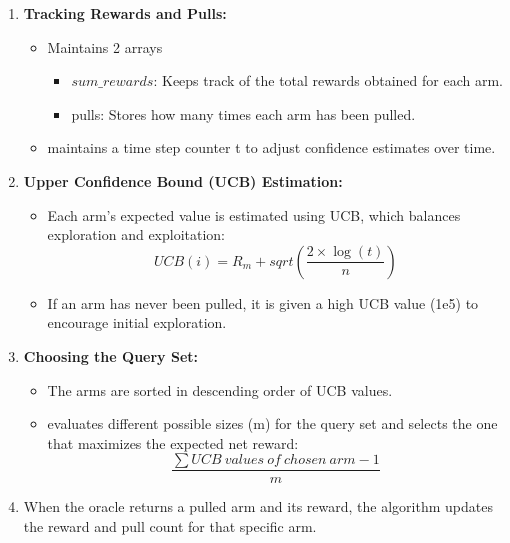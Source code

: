 \documentclass{article}
\begin{document}
    \begin{enumerate}
        \item \textbf{Tracking Rewards and Pulls:} \begin{itemize}
            \item Maintains 2 arrays \begin{itemize}
                \item $sum\_rewards$: Keeps track of the total rewards obtained for each arm.
                \item pulls: Stores how many times each arm has been pulled.
            \end{itemize}
            \item maintains a time step counter t to adjust confidence estimates over time.
        \end{itemize}

        \item \textbf{Upper Confidence Bound (UCB) Estimation:} \begin{itemize}
            \item Each arm’s expected value is estimated using UCB, which balances exploration and exploitation:
            \begin{equation}
                UCB(i) = R_m + sqrt(\frac{2\times \log(t)}{n})
            \end{equation}
            \item If an arm has never been pulled, it is given a high UCB value (1e5) to encourage initial exploration.
        \end{itemize}

        \item \textbf{Choosing the Query Set:} \begin{itemize}
            \item The arms are sorted in descending order of UCB values.
            \item evaluates different possible sizes (m) for the query set and selects the one that maximizes the expected net reward: 
            \begin{equation}
                \frac{\sum{UCB\ values\ of\ chosen\ arm -1}}{m}
            \end{equation}
        \end{itemize}

        \item When the oracle returns a pulled arm and its reward, the algorithm updates the reward and pull count for that specific arm.
    \end{enumerate}
\end{document}
